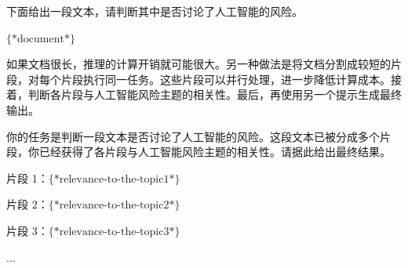 \vspace{0.5em}
\begin{tcolorbox}

\begingroup
\setlength{\leftskip}{2em}
\setlength{\rightskip}{2em}

下面给出一段文本，请判断其中是否讨论了人工智能的风险。

\vspace{0.5em}

$\{*\mathrm{document}*\}$

\vspace{0.5em}

\underline{\hspace{2em}}

\endgroup

\end{tcolorbox}
\vspace{0.5em}

如果文档很长，推理的计算开销就可能很大。另一种做法是将文档分割成较短的片段，对每个片段执行同一任务。这些片段可以并行处理，进一步降低计算成本。接着，判断各片段与人工智能风险主题的相关性。最后，再使用另一个提示生成最终输出。

\vspace{0.5em}
\begin{tcolorbox}

\begingroup
\setlength{\leftskip}{2em}
\setlength{\rightskip}{2em}

你的任务是判断一段文本是否讨论了人工智能的风险。这段文本已被分成多个片段，你已经获得了各片段与人工智能风险主题的相关性。请据此给出最终结果。

\vspace{0.5em}

片段 1：$\{*\mathrm{relevance\textrm{-}to\textrm{-}the\textrm{-}topic1}*\}$

\vspace{0.3em}

片段 2：$\{*\mathrm{relevance\textrm{-}to\textrm{-}the\textrm{-}topic2}*\}$

\vspace{0.3em}

片段 3：$\{*\mathrm{relevance\textrm{-}to\textrm{-}the\textrm{-}topic3}*\}$

\vspace{0.3em}

...

\vspace{0.5em}

\underline{\hspace{2em}}

\endgroup

\end{tcolorbox}
\vspace{0.5em}

